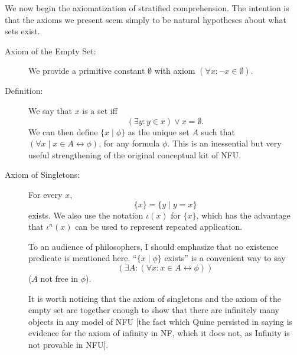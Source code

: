 \documentclass{slides}
\begin{document}
\begin{slide}

We now begin the axiomatization of stratified comprehension.  The intention is that the axioms we present seem
simply to be natural hypotheses about what sets exist.

\begin{description}

\item[Axiom of the Empty Set:]  We provide a primitive constant $\emptyset$ with axiom $(\forall x:\neg x \in \emptyset)$.

\item[Definition:]  We say that $x$ is a set iff $$(\exists y:y \in x) \vee x = \emptyset.$$   We can then define
$\{x\mid \phi\}$ as the unique set $A$ such that $(\forall x \mid x \in A \leftrightarrow \phi)$, for any formula $\phi$.  This is an inessential but very useful strengthening of the original conceptual kit of NFU.

\end{description}

\end{slide}

\begin{slide}

\begin{description}

\item[Axiom of Singletons:]  For every $x$, $$\{x\} = \{y\mid y=x\}$$ exists.    We also use the notation $\iota(x)$ for $\{x\}$, which has the advantage that $\iota^n(x)$ can be used to represent repeated application.

To an audience of philosophers, I should emphasize that no existence predicate is mentioned here.  ``$\{x \mid \phi\}$ exists'' is a convenient way to
say $$(\exists A:(\forall x:x \in A \leftrightarrow \phi))$$ ($A$ not free in $\phi$).

It is worth noticing that the axiom of singletons and the axiom of the empty set are together enough to show that there are infinitely many objects in any model of NFU [the fact which Quine persisted in saying is evidence for the axiom of infinity in NF, which it does not, as Infinity is not provable in NFU].

\end{description}

\end{slide}
\end{document}
